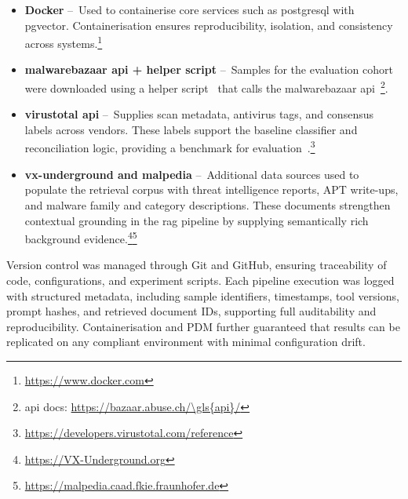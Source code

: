 \begin{itemize}
      \item \textbf{Docker} --~Used to containerise core services such as \gls{postgresql} with
            \gls{pgvector}. Containerisation ensures reproducibility, isolation, and consistency
            across systems.\footnote{\url{https://www.docker.com}}

      \item \textbf{\gls{malwarebazaar} \gls{api} + helper script} --~Samples for the evaluation cohort were
            downloaded using a helper script~\cite{rexisSamplesExtractorScript} that calls the
            \gls{malwarebazaar} \gls{api}~\footnote{\gls{api} docs: \url{https://bazaar.abuse.ch/\gls{api}/}}.

      \item \textbf{\gls{virustotal} \gls{api}} --~Supplies scan metadata, antivirus tags, and consensus labels
            across vendors. These labels support the baseline classifier and reconciliation logic, providing
            a benchmark for evaluation~\cite{rexisReconciliationGuide}.\footnote{\url{https://developers.virustotal.com/reference}}

      \item \textbf{\gls{vx-underground} and \gls{malpedia}} --~Additional data sources used to populate
            the retrieval corpus with threat intelligence reports, APT write-ups, and malware family and category descriptions.
            These documents strengthen contextual grounding in the \gls{rag} pipeline by supplying semantically
            rich background evidence.\footnote{\url{https://VX-Underground.org}}\footnote{\url{https://malpedia.caad.fkie.fraunhofer.de}}
\end{itemize}

\noindent
Version control was managed through Git and GitHub, ensuring traceability of code, configurations,
and experiment scripts. Each pipeline execution was logged with structured metadata, including sample
identifiers, timestamps, tool versions, prompt hashes, and retrieved document IDs, supporting full
auditability and reproducibility. Containerisation and PDM further guaranteed that results can be
replicated on any compliant environment with minimal configuration drift.

